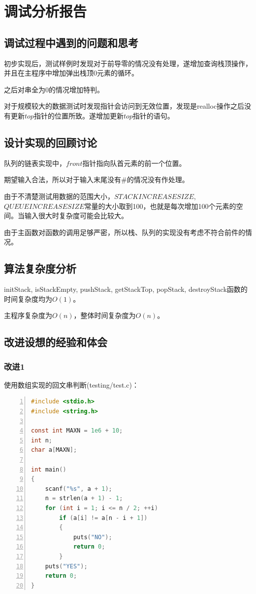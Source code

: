 \documentclass{article}
\begin{document}
\section{调试分析报告}

\subsection{调试过程中遇到的问题和思考}

初步实现后，测试样例时发现对于前导零的情况没有处理，遂增加查询栈顶操作，并且在主程序中增加弹出栈顶0元素的循环。

之后对串全为0的情况增加特判。

对于规模较大的数据测试时发现指针会访问到无效位置，发现是realloc操作之后没有更新$top$指针的位置所致。遂增加更新$top$指针的语句。

\subsection{设计实现的回顾讨论}

队列的链表实现中，$front$指针指向队首元素的前一个位置。

期望输入合法，所以对于输入末尾没有\#的情况没有作处理。

由于不清楚测试用数据的范围大小，$STACKINCREASESIZE$,$QUEUEINCREASESIZE$常量的大小取到100，也就是每次增加100个元素的空间。当输入很大时复杂度可能会比较大。

由于主函数对函数的调用足够严密，所以栈、队列的实现没有考虑不符合前件的情况。

\subsection{算法复杂度分析}

initStack, isStackEmpty, pushStack, getStackTop, popStack, destroyStack函数的时间复杂度均为$O(1)$。

主程序复杂度为$O(n)$，整体时间复杂度为$O(n)$。

\subsection{改进设想的经验和体会}

\subsubsection{改进1}

使用数组实现的回文串判断(testing/test.c)：

\begin{lstlisting}[language={C},
    numbers=left,
    numberstyle=\tiny\consolas,
    basicstyle=\small\consolas]
#include <stdio.h>
#include <string.h>

const int MAXN = 1e6 + 10;
int n;
char a[MAXN];

int main()
{
    scanf("%s", a + 1);
    n = strlen(a + 1) - 1;
    for (int i = 1; i <= n / 2; ++i)
        if (a[i] != a[n - i + 1])
        {
            puts("NO");
            return 0;
        }
    puts("YES");
    return 0;
}
\end{lstlisting}
\end{document}
